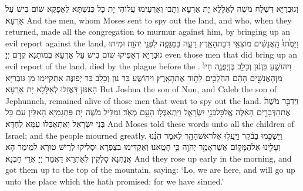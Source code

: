 {וְגוּבְרַיָּא דִּשְׁלַח מֹשֶׁה לְאַלָּלָא יָת אַרְעָא וְתָבוּ וְאַרְעִימוּ עֲלוֹהִי יָת כָּל כְּנִשְׁתָּא לְאַפָּקָא שׁוֹם בִּישׁ עַל אַרְעָא׃}
{And the men, whom Moses sent to spy out the land, and who, when they returned, made all the congregation to murmur against him, by bringing up an evil report against the land,}{}
{וַיָּמֻ֙תוּ֙ הָֽאֲנָשִׁ֔ים מוֹצִאֵ֥י דִבַּת\maqqaf הָאָ֖רֶץ רָעָ֑ה בַּמַּגֵּפָ֖ה לִפְנֵ֥י יְהֹוָֽה׃}
{וּמִיתוּ גּוּבְרַיָּא דְּאַפִּיקוּ שׁוֹם בִּישׁ עַל אַרְעָא בְּמוֹתָנָא קֳדָם יְיָ׃}
{even those men that did bring up an evil report of the land, died by the plague before the \lord.}{}
{וִיהוֹשֻׁ֣עַ בִּן\maqqaf נ֔וּן וְכָלֵ֖ב בֶּן\maqqaf יְפֻנֶּ֑ה חָיוּ֙ מִן\maqqaf הָאֲנָשִׁ֣ים הָהֵ֔ם הַהֹֽלְכִ֖ים לָת֥וּר אֶת\maqqaf הָאָֽרֶץ׃}
{וִיהוֹשֻעַ בַּר נוּן וְכָלֵב בַּר יְפוּנֶּה אִתְקַיַּימוּ מִן גּוּבְרַיָּא הָאִנּוּן דַּאֲזַלוּ לְאַלָּלָא יָת אַרְעָא׃}
{But Joshua the son of Nun, and Caleb the son of Jephunneh, remained alive of those men that went to spy out the land.}{}
{וַיְדַבֵּ֤ר מֹשֶׁה֙ אֶת\maqqaf הַדְּבָרִ֣ים הָאֵ֔לֶּה אֶֽל\maqqaf כׇּל\maqqaf בְּנֵ֖י יִשְׂרָאֵ֑ל וַיִּֽתְאַבְּל֥וּ הָעָ֖ם מְאֹֽד׃}
{וּמַלֵּיל מֹשֶׁה יָת פִּתְגָמַיָּא הָאִלֵּין עִם כָּל בְּנֵי יִשְׂרָאֵל וְאִתְאַבַּלוּ עַמָּא לַחְדָּא׃}
{And Moses told these words unto all the children of Israel; and the people mourned greatly.}{}
{וַיַּשְׁכִּ֣מוּ בַבֹּ֔קֶר וַיַּֽעֲל֥וּ אֶל\maqqaf רֹאשׁ\maqqaf הָהָ֖ר לֵאמֹ֑ר הִנֶּ֗נּוּ וְעָלִ֛ינוּ אֶל\maqqaf הַמָּק֛וֹם אֲשֶׁר\maqqaf אָמַ֥ר יְהֹוָ֖ה כִּ֥י חָטָֽאנוּ׃}
{וְאַקְדִּימוּ בְצַפְרָא וּסְלִיקוּ לְרֵישׁ טוּרָא לְמֵימַר הָא אֲנַחְנָא סָלְקִין לְאַתְרָא דַּאֲמַר יְיָ אֲרֵי חַבְנָא׃}
{And they rose up early in the morning, and got them up to the top of the mountain, saying: ‘Lo, we are here, and will go up unto the place which the \lord\space hath promised; for we have sinned.’}{}
